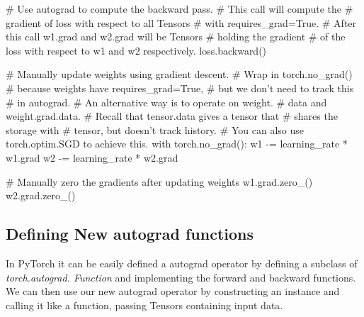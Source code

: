 \documentclass[11pt]{article}
\begin{document}
\begin{python}
    # Use autograd to compute the backward pass.
    # This call will compute the
    # gradient of loss with respect to all Tensors 
    # with requires_grad=True.
    # After this call w1.grad and w2.grad will be Tensors
    # holding the gradient
    # of the loss with respect to w1 and w2 respectively.
    loss.backward()

    # Manually update weights using gradient descent.
    # Wrap in torch.no_grad()
    # because weights have requires_grad=True, 
    # but we don't need to track this
    # in autograd.
    # An alternative way is to operate on weight.
    # data and weight.grad.data.
    # Recall that tensor.data gives a tensor that 
    # shares the storage with
    # tensor, but doesn't track history.
    # You can also use torch.optim.SGD to achieve this.
    with torch.no_grad():
        w1 -= learning_rate * w1.grad
        w2 -= learning_rate * w2.grad

        # Manually zero the gradients after updating weights
        w1.grad.zero_()
        w2.grad.zero_()
\end{python}{}
\clearpage
\subsection{Defining New autograd functions}
In PyTorch it can be easily defined a autograd operator by defining a subclass of \textit{torch.autograd. Function } and implementing the forward and backward functions. We can then use our new autograd operator by constructing an instance and calling it like a function, passing Tensors containing input data.
\end{document}
